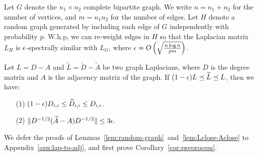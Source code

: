 \begin{lemma}
\label{lem:random-graph}
Let $G$ denote the $n_1 \times n_2$ complete bipartite graph.
We write $n = n_1 + n_2$ for the number of vertices, and $m = n_1 n_2$ for the number of edges.
Let $H$ denote a random graph generated by including each edge of $G$ independently with probability $p$.
W.h.p, we can re-weight edges in $H$ so that the Laplacian matrix $L_H$ is $\epsilon$-spectrally similar with $L_G$, where $\epsilon = O\left(\sqrt{\frac{n \log n}{p m}}\right)$.
\end{lemma}


\begin{lemma}
\label{lem:Lclose-Aclose}
Let $L = D - A$ and $\tilde L = \tilde{D} - \tilde{A}$ be two graph Laplacians, where $D$ is the degree matrix and $A$ is the adjacency matrix of the graph.
If $(1-\epsilon) L \preceq \widetilde L \preceq L$, then we have:%
\begin{enumerate}
\item[(1)] $(1-\epsilon) D_{i,i} \le \widetilde{D}_{i,i} \le D_{i,i}$.
\item[(2)] $\lVert D^{-1/2}(\widetilde{A} - A)D^{-1/2}{\rVert} \le 3\epsilon$.
\end{enumerate}
\end{lemma}
We defer the proofs of Lemmas~\ref{lem:random-graph}~and~\ref{lem:Lclose-Aclose} to Appendix~\ref{apx:lap-to-adj}, and first prove Corollary~\ref{cor:preprocess}.
%

